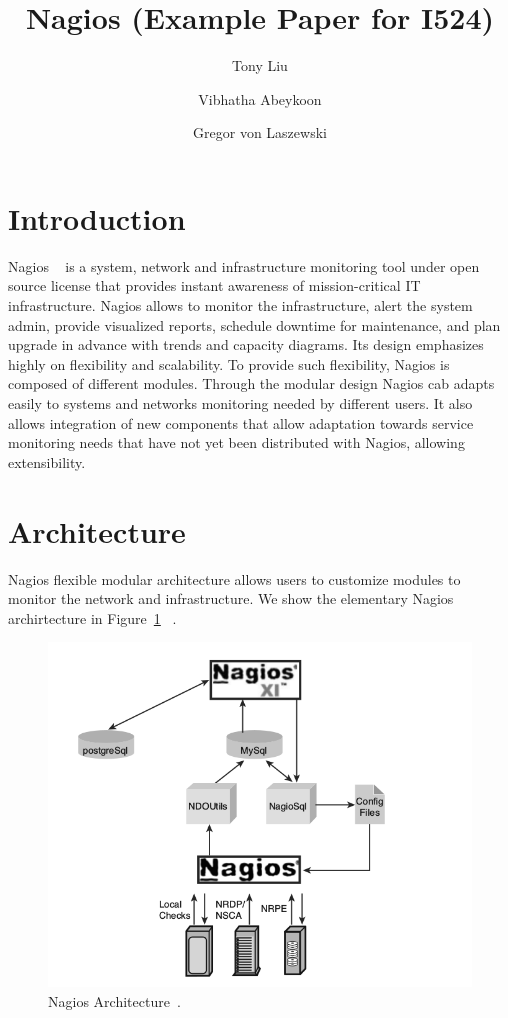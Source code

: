 \documentclass[9pt,twocolumn,twoside]{styles/osajnl}
\title{\centering%
Nagios (Example Paper for I524)}
\author[1]{Tony Liu}
\author[1]{Vibhatha Abeykoon}
\author[1]{Gregor von Laszewski}
\affil[1]{School of Informatics and Computing, Bloomington, IN 47408, U.S.A.}
\begin{document}
\maketitle

\section{Introduction}

Nagios ~\cite{www-nagios, wiki-nagios} is a system, network and
infrastructure monitoring tool under open source license that provides
instant awareness of mission-critical IT infrastructure. Nagios allows
to monitor the infrastructure, alert the system admin, provide
visualized reports, schedule downtime for maintenance, and plan
upgrade in advance with trends and capacity diagrams. Its design
emphasizes highly on flexibility and scalability. To provide such
flexibility, Nagios is composed of different modules. Through the
modular design Nagios cab adapts easily to systems and networks
monitoring needed by different users. It also allows integration of new
components that allow adaptation towards service monitoring needs that
have not yet been distributed with Nagios, allowing extensibility.

\section{Architecture}

Nagios \cite{nagios-paper-2012} flexible modular architecture allows
users to customize modules to monitor the network and
infrastructure. We show the elementary Nagios archirtecture in
Figure~\ref{fig:Nagios-architecture} ~\cite{nagios-book}.

\begin{figure}[htb]
\centering
\includegraphics[width=\columnwidth]{images/nagios-architecture}
\caption{Nagios Architecture~\cite{nagios-book}.}
\label{fig:Nagios-architecture}
\end{figure}
\end{document}
